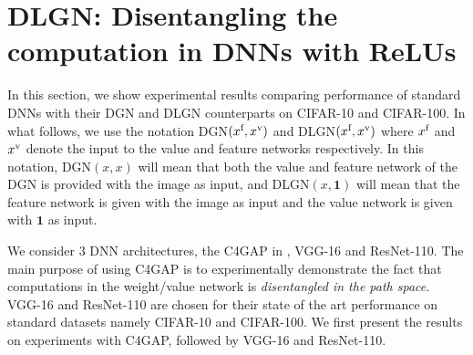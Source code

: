 \section{DLGN:  Disentangling the computation in DNNs with ReLUs}\label{sec:dlgn}
In this section, we show experimental results comparing performance of standard DNNs with their DGN and DLGN counterparts on CIFAR-10 and CIFAR-100. In what follows, we use the notation DGN$(x^{\text{f}},x^{\text{v}})$ and DLGN$(x^{\text{f}},x^{\text{v}})$ where $x^{\text{f}}$ and $x^{\text{v}}$ denote the input to the value and feature networks respectively. In this notation, DGN$(x,x)$ will mean that both the value and feature network of the DGN is provided with the image as input, and DLGN$(x,\mathbf{1})$ will mean that the feature network is given with the image as input and the value network is given with $\mathbf{1}$ as input.

We consider $3$ DNN architectures, the C4GAP in , VGG-16 and ResNet-110. The main purpose of using C4GAP is to experimentally demonstrate the fact that computations in the weight/value network is \emph{disentangled in the path space}. VGG-16 and ResNet-110 are chosen for their state of the art performance on standard datasets namely CIFAR-10 and CIFAR-100. We first present the results on experiments with C4GAP, followed by VGG-16 and ResNet-110. 






 

